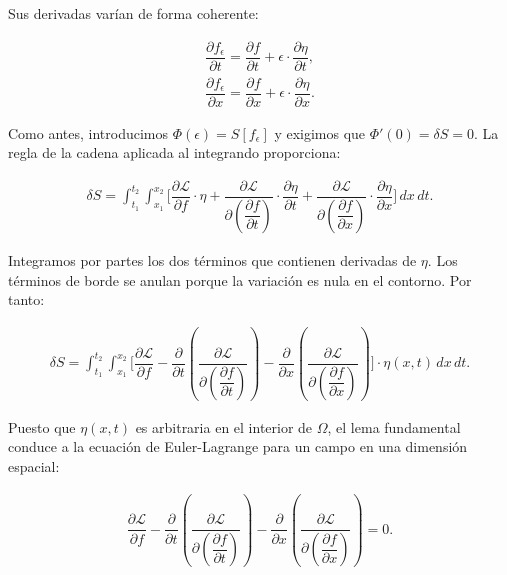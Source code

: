 \documentclass[
  spanish,
]{article}
\begin{document}
Sus derivadas varían de forma coherente:

\[
\begin{aligned}
\dfrac{\partial f_\epsilon}{\partial t}
= \dfrac{\partial f}{\partial t}
+ \epsilon \cdot \dfrac{\partial\eta}{\partial t},
\\
\dfrac{\partial f_\epsilon}{\partial x}
= \dfrac{\partial f}{\partial x}
+ \epsilon \cdot \dfrac{\partial\eta}{\partial x}.
\end{aligned}
\]

Como antes, introducimos \(\Phi(\epsilon)=S[f_\epsilon]\) y exigimos que
\(\Phi'(0)=\delta S=0\). La regla de la cadena aplicada al integrando
proporciona:

\[
\begin{aligned}
\delta S
= \int_{t_1}^{t_2}\int_{x_1}^{x_2}
\Bigg[
\dfrac{\partial\mathcal{L}}{\partial f} \cdot \eta
+ \dfrac{\partial\mathcal{L}}{\partial\left(\dfrac{\partial f}{\partial t}\right)}
\cdot \dfrac{\partial\eta}{\partial t}
+ \dfrac{\partial\mathcal{L}}{\partial\left(\dfrac{\partial f}{\partial x}\right)}
\cdot \dfrac{\partial\eta}{\partial x}
\Bigg]\,dx\,dt.
\end{aligned}
\]

Integramos por partes los dos términos que contienen derivadas de
\(\eta\). Los términos de borde se anulan porque la variación es nula en
el contorno. Por tanto:

\[
\begin{aligned}
\delta S
= \int_{t_1}^{t_2}\int_{x_1}^{x_2}
\Bigg[
\dfrac{\partial\mathcal{L}}{\partial f}
- \dfrac{\partial}{\partial t}
\left(\dfrac{\partial\mathcal{L}}{\partial\left(\dfrac{\partial f}{\partial t}\right)}\right)
- \dfrac{\partial}{\partial x}
\left(\dfrac{\partial\mathcal{L}}{\partial\left(\dfrac{\partial f}{\partial x}\right)}\right)
\Bigg] \cdot \eta(x,t)\,dx\,dt.
\end{aligned}
\]

Puesto que \(\eta(x,t)\) es arbitraria en el interior de \(\Omega\), el
lema fundamental conduce a la ecuación de Euler-Lagrange para un campo
en una dimensión espacial:

\[
\begin{aligned}
\dfrac{\partial\mathcal{L}}{\partial f}
- \dfrac{\partial}{\partial t}
\left(\dfrac{\partial\mathcal{L}}{\partial\left(\dfrac{\partial f}{\partial t}\right)}\right)
- \dfrac{\partial}{\partial x}
\left(\dfrac{\partial\mathcal{L}}{\partial\left(\dfrac{\partial f}{\partial x}\right)}\right)
= 0.
\end{aligned}
\]
\end{document}
